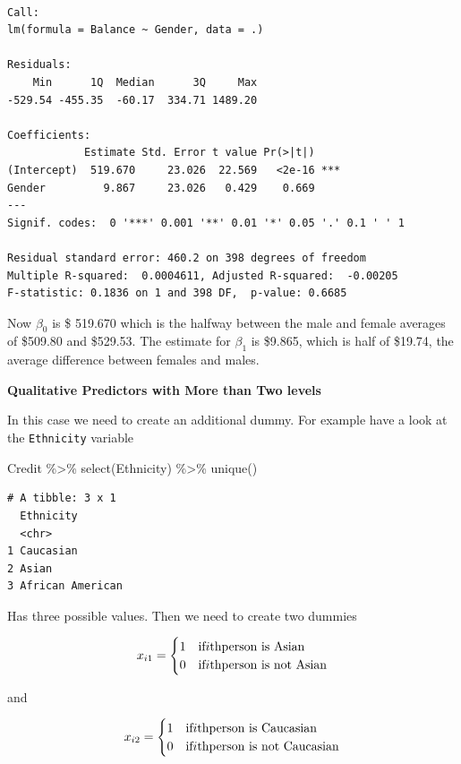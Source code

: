 \documentclass[
  letterpaper,
  DIV=11,
  numbers=noendperiod]{scrreprt}
\newenvironment{Shaded}{\begin{snugshade}}{\end{snugshade}}
\newcommand{\FunctionTok}[1]{\textcolor[rgb]{0.02,0.16,0.49}{#1}}
\newcommand{\NormalTok}[1]{\textcolor[rgb]{0.33,0.33,0.33}{#1}}
\newcommand{\SpecialCharTok}[1]{\textcolor[rgb]{0.00,0.46,0.62}{#1}}
\begin{document}
\begin{verbatim}

Call:
lm(formula = Balance ~ Gender, data = .)

Residuals:
    Min      1Q  Median      3Q     Max 
-529.54 -455.35  -60.17  334.71 1489.20 

Coefficients:
            Estimate Std. Error t value Pr(>|t|)    
(Intercept)  519.670     23.026  22.569   <2e-16 ***
Gender         9.867     23.026   0.429    0.669    
---
Signif. codes:  0 '***' 0.001 '**' 0.01 '*' 0.05 '.' 0.1 ' ' 1

Residual standard error: 460.2 on 398 degrees of freedom
Multiple R-squared:  0.0004611, Adjusted R-squared:  -0.00205 
F-statistic: 0.1836 on 1 and 398 DF,  p-value: 0.6685
\end{verbatim}

Now \(\beta_0\) is \$ 519.670 which is the halfway between the male and
female averages of \$509.80 and \$529.53. The estimate for \(\beta_1\)
is \$9.865, which is half of \$19.74, the average difference between
females and males.

\textbf{Qualitative Predictors with More than Two levels}

In this case we need to create an additional dummy. For example have a
look at the \texttt{Ethnicity} variable

\begin{Shaded}
\begin{Highlighting}[]
\NormalTok{Credit }\SpecialCharTok{\%\textgreater{}\%} \FunctionTok{select}\NormalTok{(Ethnicity) }\SpecialCharTok{\%\textgreater{}\%} \FunctionTok{unique}\NormalTok{()}
\end{Highlighting}
\end{Shaded}

\begin{verbatim}
# A tibble: 3 x 1
  Ethnicity       
  <chr>           
1 Caucasian       
2 Asian           
3 African American
\end{verbatim}

Has three possible values. Then we need to create two dummies

\[
x_{i1} = 
\begin{cases}
1 & \text{if}\space i\text{th}\space \text{person is Asian} \\
0 & \text{if}\space i\text{th}\space \text{person is not Asian} 
\end{cases}
\]

and

\[
x_{i2} = 
\begin{cases}
1 & \text{if}\space i\text{th}\space \text{person is Caucasian} \\
0 & \text{if}\space i\text{th}\space \text{person is not Caucasian} 
\end{cases}
\]
\end{document}
